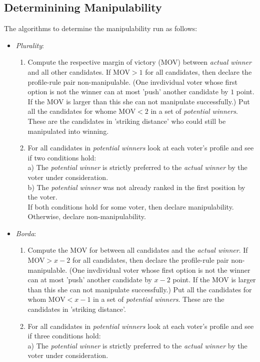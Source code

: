 \documentclass[10pt,a4paper]{article}
\begin{document}
\subsection{Determinining Manipulability}
\noindent The algorithms to determine the manipulability run as follows:\\
\begin{itemize}
\item \textit{Plurality}: \begin{enumerate}
\item  Compute the respective margin of victory (MOV) between \textit{actual winner} and all other candidates. If MOV$>1$ for all candidates, then declare the profile-rule pair non-manipulable. (One invdividual voter whose first option is not the winner can at most 'push' another candidate by $1$ point. If the MOV is larger than this she can not manipulate successfully.) Put all the candidates for whome MOV$<2$ in a set of \textit{potential winners}. These are the candidates in 'striking distance' who could still be manipulated into winning.
\item For all candidates in \textit{potential winners} look at each voter's profile and see if two conditions hold: \\
a) The \textit{potential winner} is strictly preferred to the \textit{actual winner} by the voter under consideration.\\
b) The \textit{potential winner} was not already ranked in the first position by the voter.\\
If both conditions hold for some voter, then declare manipulability. Otherwise, declare non-manipulability.
\end{enumerate}
\item \textit{Borda}: \begin{enumerate}
\item Compute the MOV for between all candidates and the \textit{actual winner}. If MOV$>x-2$ for all candidates, then declare the profile-rule pair non-manipulable. (One invdividual voter whose first option is not the winner can at most 'push' another candidate by $x-2$ point. If the MOV is larger than this she can not manipulate successfully.) Put all the candidates for whom MOV$<x-1$ in a set of \textit{potential winners}. These are the candidates in 'striking distance'.
\item For all candidates in \textit{potential winners} look at each voter's profile and see if three conditions hold: \\
a) The \textit{potential winner} is strictly preferred to the \textit{actual winner} by the voter under consideration.\\

\end{enumerate}
\end{itemize}
\end{document}
